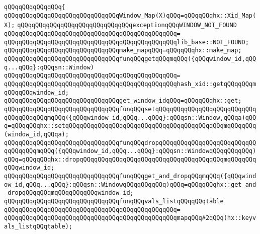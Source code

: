 \verb|qQQqqQQqqQQqqQQq{|\newline
\verb|qQQqqQQqqQQqqQQqqQQqqQQqqQQqqQQqWindow_Map(X)qQQq=qQQqqQQqhx::Xid_Map(X);|\newline
\newline
\verb|qQQqqQQqqQQqqQQqqQQqqQQqqQQqqQQqexceptionqQQqWINDOW_NOT_FOUND|\newline
\verb|qQQqqQQqqQQqqQQqqQQqqQQqqQQqqQQqqQQqqQQqqQQqqQQq=|\newline
\verb|qQQqqQQqqQQqqQQqqQQqqQQqqQQqqQQqqQQqqQQqqQQqqQQqlib_base::NOT_FOUND;|\newline
\newline
\verb|qQQqqQQqqQQqqQQqqQQqqQQqqQQqqQQqmake_mapqQQq=qQQqqQQqhx::make_map;|\newline
\newline
\verb|qQQqqQQqqQQqqQQqqQQqqQQqqQQqqQQqfunqQQqgetqQQqmqQQq({qQQqwindow_id,qQQq...qQQq}:qQQqsn::Window)|\newline
\verb|qQQqqQQqqQQqqQQqqQQqqQQqqQQqqQQqqQQqqQQqqQQqqQQq=|\newline
\verb|qQQqqQQqqQQqqQQqqQQqqQQqqQQqqQQqqQQqqQQqqQQqqQQqhash_xid::getqQQqqQQqmqQQqqQQqwindow_id;|\newline
\newline
\verb|qQQqqQQqqQQqqQQqqQQqqQQqqQQqqQQqget_window_idqQQq=qQQqqQQqhx::get;|\newline
\newline
\verb|qQQqqQQqqQQqqQQqqQQqqQQqqQQqqQQqfunqQQqsetqQQqqQQqqQQqqQQqqQQqqQQqqQQqqQQqqQQqqQQqmqQQq({qQQqwindow_id,qQQq...qQQq}:qQQqsn::Window,qQQqa)qQQq=qQQqqQQqhx::setqQQqqQQqqQQqqQQqqQQqqQQqqQQqqQQqqQQqqQQqqQQqmqQQqqQQq(window_id,qQQqa);|\newline
\verb|qQQqqQQqqQQqqQQqqQQqqQQqqQQqqQQqfunqQQqdropqQQqqQQqqQQqqQQqqQQqqQQqqQQqqQQqqQQqmqQQq({qQQqwindow_id,qQQq...qQQq}:qQQqsn::WindowqQQqqQQqqQQq)qQQq=qQQqqQQqhx::dropqQQqqQQqqQQqqQQqqQQqqQQqqQQqqQQqqQQqqQQqmqQQqqQQqqQQqwindow_id;|\newline
\verb|qQQqqQQqqQQqqQQqqQQqqQQqqQQqqQQqfunqQQqget_and_dropqQQqmqQQq({qQQqwindow_id,qQQq...qQQq}:qQQqsn::WindowqQQqqQQqqQQq)qQQq=qQQqqQQqhx::get_and_dropqQQqqQQqmqQQqqQQqqQQqwindow_id;|\newline
\newline
\verb|qQQqqQQqqQQqqQQqqQQqqQQqqQQqqQQqfunqQQqvals_listqQQqqQQqtable|\newline
\verb|qQQqqQQqqQQqqQQqqQQqqQQqqQQqqQQqqQQqqQQqqQQqqQQq=|\newline
\verb|qQQqqQQqqQQqqQQqqQQqqQQqqQQqqQQqqQQqqQQqqQQqqQQqmapqQQq#2qQQq(hx::keyvals_listqQQqtable);|\newline
